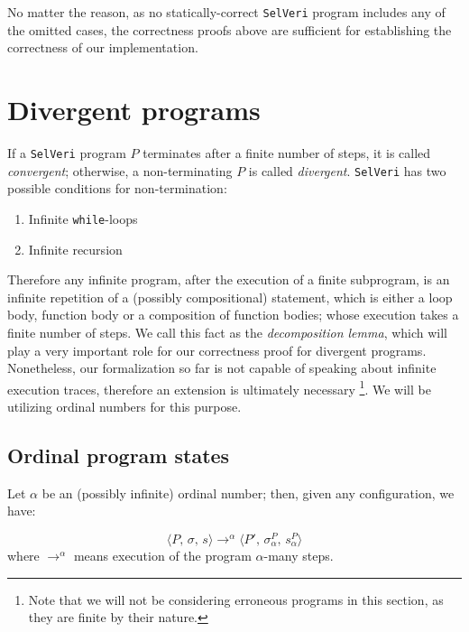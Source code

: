 \documentclass{article}
\begin{document}
No matter the reason, as no statically-correct \texttt{SelVeri} program includes any of the omitted cases, the correctness proofs above are sufficient for establishing the correctness of our implementation. \\

\vspace{1em}
\section{Divergent programs}

If a \texttt{SelVeri} program $P$ terminates after a finite number of steps, it is called \textit{convergent}; otherwise, a non-terminating $P$ is called \textit{divergent}. \texttt{SelVeri} has two possible conditions for non-termination:

\begin{enumerate}
    \item Infinite \texttt{while}-loops
    \item Infinite recursion
\end{enumerate}

Therefore any infinite program, after the execution of a finite subprogram, is an infinite repetition of a (possibly compositional) statement, which is either a loop body, function body or a composition of function bodies; whose execution takes a finite number of steps. We call this fact as the \textit{decomposition lemma}, which will play a very important role for our correctness proof for divergent programs. Nonetheless, our formalization so far is not capable of speaking about infinite execution traces, therefore an extension is ultimately necessary \footnote{Note that we will not be considering erroneous programs in this section, as they are finite by their nature.}. We will be utilizing ordinal numbers for this purpose.\\

\subsection{Ordinal program states}

Let $\alpha$ be an (possibly infinite) ordinal number; then, given any configuration, we have:

\[
\langle P,\, \sigma,\, s \rangle \rightarrow^\alpha \langle P',\, \sigma^P_\alpha,\, s^P_\alpha \rangle
\] where $\rightarrow^\alpha$ means execution of the program $\alpha$-many steps. \\
\end{document}
